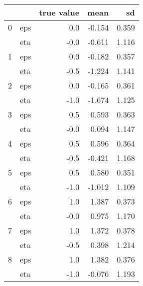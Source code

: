 \begin{tabular}{llrrr}
\toprule
  &     &  true value &   mean &     sd \\
\midrule
0 & eps &         0.0 & -0.154 &  0.359 \\
  & eta &        -0.0 & -0.611 &  1.116 \\
1 & eps &         0.0 & -0.182 &  0.357 \\
  & eta &        -0.5 & -1.224 &  1.141 \\
2 & eps &         0.0 & -0.165 &  0.361 \\
  & eta &        -1.0 & -1.674 &  1.125 \\
3 & eps &         0.5 &  0.593 &  0.363 \\
  & eta &        -0.0 &  0.094 &  1.147 \\
4 & eps &         0.5 &  0.596 &  0.364 \\
  & eta &        -0.5 & -0.421 &  1.168 \\
5 & eps &         0.5 &  0.580 &  0.351 \\
  & eta &        -1.0 & -1.012 &  1.109 \\
6 & eps &         1.0 &  1.387 &  0.373 \\
  & eta &        -0.0 &  0.975 &  1.170 \\
7 & eps &         1.0 &  1.372 &  0.378 \\
  & eta &        -0.5 &  0.398 &  1.214 \\
8 & eps &         1.0 &  1.382 &  0.376 \\
  & eta &        -1.0 & -0.076 &  1.193 \\
\bottomrule
\end{tabular}
